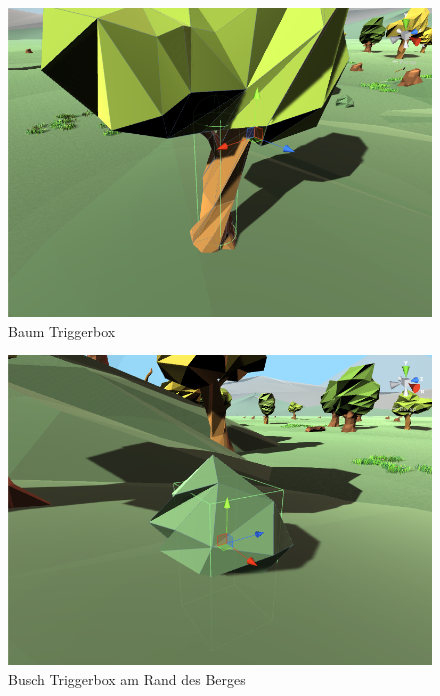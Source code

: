 \begin{figure}[H]
\centering
\caption{Baum Triggerbox}
\label{Abb:BaumTrigger}
\includegraphics[scale=0.55]{Bilder/BaumTrigger.png}
\end{figure}

\begin{figure}[H]
\centering
\caption{Busch Triggerbox am Rand des Berges}
\label{Abb:BuschTrigger}
\includegraphics[scale=0.55]{Bilder/BuschTrigger.png}
\end{figure}

